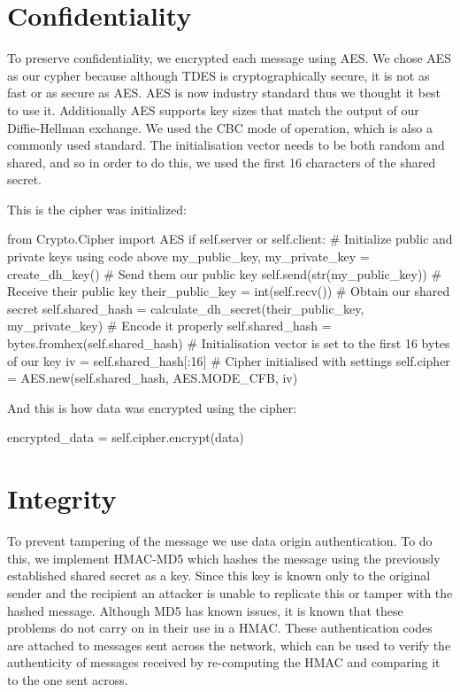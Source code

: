 \documentclass[9pt,a4paper]{article}
\begin{document}
\section{Confidentiality}
\vspace{-2ex}
To preserve confidentiality, we encrypted each message using AES. We chose AES as our cypher because although TDES is cryptographically secure, it is not as fast or as secure as AES. AES is now industry standard thus we thought it best to use it. Additionally AES supports key sizes that match the output of our Diffie-Hellman exchange. We used the CBC mode of operation, which is also a commonly used standard. The initialisation vector needs to be both random and shared, and so in order to do this, we used the first 16 characters of the shared secret.

This is the cipher was initialized:
\begin{center}
\vspace{-2ex}
\begin{python}
from Crypto.Cipher import AES
if self.server or self.client:
    # Initialize public and private keys using code above
    my_public_key, my_private_key = create_dh_key()
    # Send them our public key
    self.send(str(my_public_key))
    # Receive their public key
    their_public_key = int(self.recv())
    # Obtain our shared secret
    self.shared_hash = calculate_dh_secret(their_public_key, my_private_key)
    # Encode it properly
    self.shared_hash = bytes.fromhex(self.shared_hash)
# Initialisation vector is set to the first 16 bytes of our key
iv = self.shared_hash[:16]
# Cipher initialised with settings
self.cipher = AES.new(self.shared_hash, AES.MODE_CFB, iv)
\end{python}
\end{center}
And this is how data was encrypted using the cipher:
\begin{center}
\vspace{-2ex}
\begin{python}
encrypted_data = self.cipher.encrypt(data)
\end{python}\end{center}

\section{Integrity}
\vspace{-2ex}
To prevent tampering of the message we use data origin authentication. To do this, we implement HMAC-MD5 which hashes the message using the previously established shared secret as a key. Since this key is known only to the original sender and the recipient an attacker is unable to replicate this or tamper with the hashed message. Although MD5 has known issues, it is known that these problems do not carry on in their use in a HMAC. These authentication codes are attached to messages sent across the network, which can be used to verify the authenticity of messages received by re-computing the HMAC and comparing it to the one sent across.
\end{document}
